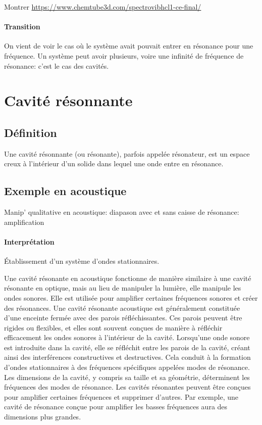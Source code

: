 \documentclass[11pt]{report}
\numberwithin{figure}{section}
\numberwithin{equation}{section}
\numberwithin{table}{section}
\newcommand{\1}{\boldsymbol{1}}
\begin{document}
Montrer \url{https://www.chemtube3d.com/spectrovibhcl1-ce-final/}

\paragraph{Transition} On vient de voir le cas où le système avait pouvait entrer en résonance pour une fréquence. Un système peut avoir plusieurs, voire une infinité de fréquence de résonance: c'est le cas des cavités.

\section{Cavité résonnante}

\subsection{Définition} 

Une cavité résonnante (ou résonante), parfois appelée résonateur, est un espace creux à l'intérieur d'un solide dans lequel une onde entre en résonance.

\subsection{Exemple en acoustique}

\textcolor{mycolor5}{Manip' qualitative en acoustique: diapason avec et sans caisse de résonance: amplification}

\paragraph*{Interprétation}

Établissement d'un système d'ondes stationnaires.

Une cavité résonante en acoustique fonctionne de manière similaire à une cavité résonante en optique, mais au lieu de manipuler la lumière, elle manipule les ondes sonores. Elle est utilisée pour amplifier certaines fréquences sonores et créer des résonances. Une cavité résonante acoustique est généralement constituée d'une enceinte fermée avec des parois réfléchissantes. Ces parois peuvent être rigides ou flexibles, et elles sont souvent conçues de manière à réfléchir efficacement les ondes sonores à l'intérieur de la cavité. Lorsqu'une onde sonore est introduite dans la cavité, elle se réfléchit entre les parois de la cavité, créant ainsi des interférences constructives et destructives. Cela conduit à la formation d'ondes stationnaires à des fréquences spécifiques appelées modes de résonance. Les dimensions de la cavité, y compris sa taille et sa géométrie, déterminent les fréquences des modes de résonance. Les cavités résonantes peuvent être conçues pour amplifier certaines fréquences et supprimer d'autres. Par exemple, une cavité de résonance conçue pour amplifier les basses fréquences aura des dimensions plus grandes.
\end{document}
